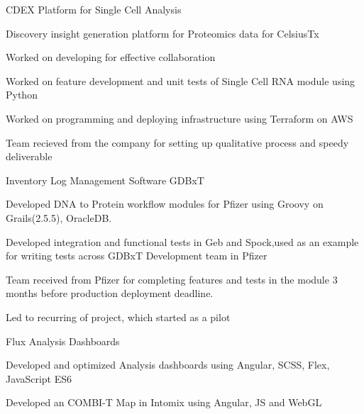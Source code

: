 \documentclass[]{single-page-resume}
\begin{document}
\begin{minipage}[t]{0.66\textwidth}
\vspace{\topsep} %
CDEX Platform for Single Cell Analysis
\begin{tightemize}
    \item Discovery insight generation platform for Proteomics data for CelsiusTx
    \item Worked on developing  for effective collaboration
    \item Worked on feature development and unit tests of Single Cell RNA module using Python
    \item Worked on programming and deploying infrastructure using Terraform on AWS
    \item Team recieved  from the company for setting up qualitative process and speedy deliverable
\end{tightemize}
\vspace{\topsep} %
Inventory Log Management Software GDBxT
\begin{tightemize}
\item Developed DNA to Protein workflow modules for Pfizer using Groovy on Grails(2.5.5), OracleDB. 
\item Developed  integration and functional tests in Geb and Spock,used as an example for writing tests across GDBxT Development team in Pfizer
\item Team received  from Pfizer for completing features and tests in the module 3 months before production deployment deadline.
  \item Led to recurring  of project, which started as a pilot
\end{tightemize}

\vspace{\topsep} %
Flux Analysis Dashboards
\begin{tightemize}
\item Developed and optimized Analysis dashboards using Angular, SCSS, Flex, JavaScript ES6
\end{tightemize}
\sectionsep

\begin{tightemize}
    \item Developed an COMBI-T Map in Intomix using Angular, JS and WebGL \end{tightemize}
\sectionsep


\end{minipage}
\end{document}
